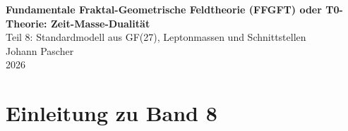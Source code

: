 


	
	\setcounter{section}{0}
	\setcounter{subsection}{0}
	\setcounter{subsubsection}{0}
	\setcounter{paragraph}{0}
	
	\setcounter{secnumdepth}{1}  %
	\makeatletter
	\renewcommand*\l@part[2]{%
		\ifnum \c@tocdepth >-2\relax
		\addpenalty{-\@highpenalty}%
		\addvspace{0.8em \@plus\p@}%
		{\leftskip 0em \relax
			\rightskip \@tocrmarg
			\parfillskip -\rightskip
			\parindent 0em \relax\@afterindenttrue
			\interlinepenalty\@M
			\leavevmode
			{\footnotesize\bfseries #1}\nobreak
			\leaders\hbox{$\m@th\mkern \@dotsep mu\hbox{}\mkern \@dotsep mu$}\hfill
			\nobreak\hb@xt@\@pnumwidth{\hss #2}\par}%
		\addvspace{0.2em \@plus\p@}%
		\nobreak
		\fi}
	\makeatother
	
	\renewcommand{\cftchapfont}{\footnotesize\bfseries}
	\renewcommand{\cftchappagefont}{\footnotesize\bfseries}
	\setlength{\cftbeforechapskip}{0.3em}
	
	\setcounter{tocdepth}{0}
	

	\begin{titlepage}
		\centering
		\vspace*{2cm}
	{\Huge\textbf{Fundamentale Fraktal-Geometrische Feldtheorie (FFGFT) oder T0-Theorie: Zeit-Masse-Dualität}}\\[1cm]
	{\Large Teil 8: Standardmodell aus GF(27), Leptonmassen und Schnittstellen}\\[2cm]
		{\large Johann Pascher}\\[1cm]
		{\large 2026}
		\vfill
	\end{titlepage}

	\frontmatter
	\pagestyle{fancy}
	\makeatletter
	\let\ps@plain\ps@fancy
	\let\ps@empty\ps@fancy
	\makeatother

	\mainmatter
	\pagestyle{fancy}
	\tableofcontents

	\chapter{Einleitung zu Band 8}
	

